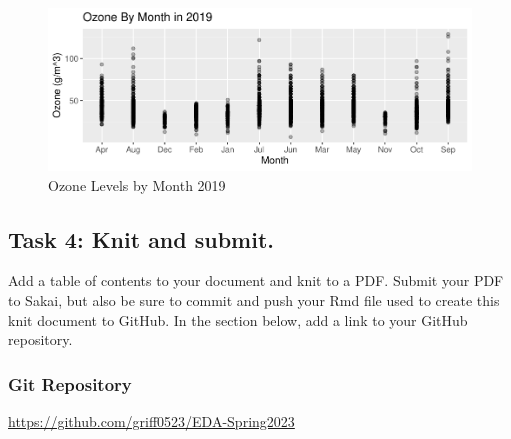 \documentclass[
]{article}
\begin{document}
\begin{figure}

\hfill{}\includegraphics{GriffinBird_A07_Lab_Crafting_Reports_files/figure-latex/Ozone2019-1} 

\caption{Ozone Levels by Month 2019}\label{fig:Ozone2019}
\end{figure}

\newpage

\hypertarget{task-4-knit-and-submit.}{%
\subsection{Task 4: Knit and submit.}\label{task-4-knit-and-submit.}}

Add a table of contents to your document and knit to a PDF. Submit your
PDF to Sakai, but also be sure to commit and push your Rmd file used to
create this knit document to GitHub. In the section below, add a link to
your GitHub repository.

\hypertarget{git-repository}{%
\subsubsection{Git Repository}\label{git-repository}}

\url{https://github.com/griff0523/EDA-Spring2023}
\end{document}
